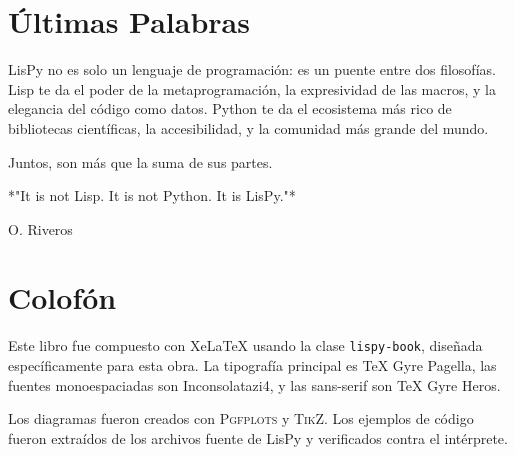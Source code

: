 \section{Últimas Palabras}

LisPy no es solo un lenguaje de programación: es un puente entre dos filosofías. Lisp te da el poder de la metaprogramación, la expresividad de las macros, y la elegancia del código como datos. Python te da el ecosistema más rico de bibliotecas científicas, la accesibilidad, y la comunidad más grande del mundo.

Juntos, son más que la suma de sus partes.

*"It is not Lisp. It is not Python. It is LisPy."*

\begin{center}
\vspace{2cm}
\textcolor{lispblue}{\large O. Riveros}
\end{center}

\section{Colofón}

Este libro fue compuesto con XeLaTeX usando la clase \texttt{lispy-book}, diseñada específicamente para esta obra. La tipografía principal es TeX Gyre Pagella, las fuentes monoespaciadas son Inconsolatazi4, y las sans-serif son TeX Gyre Heros.

Los diagramas fueron creados con \textsc{Pgfplots} y \textsc{TikZ}. Los ejemplos de código fueron extraídos de los archivos fuente de LisPy y verificados contra el intérprete.

\endinput
